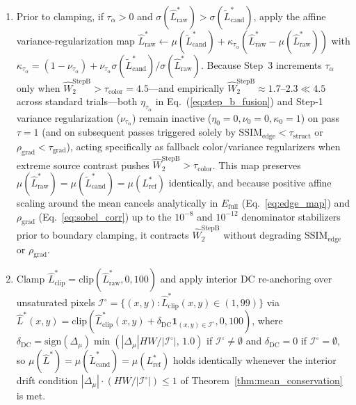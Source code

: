 \documentclass[conference,10pt]{IEEEtran}
\begin{document}
\begin{enumerate}
    \item Prior to clamping, if $\tau_\alpha > 0$ and $\sigma(\widehat{L}^*_{\text{raw}}) > \sigma(\widetilde{L}^*_{\text{cand}})$, apply the affine variance-regularization map $\widehat{L}^*_{\text{raw}} \leftarrow \mu(\widetilde{L}^*_{\text{cand}}) + \kappa_{\tau_\alpha} (\widehat{L}^*_{\text{raw}} - \mu(\widehat{L}^*_{\text{raw}}))$ with $\kappa_{\tau_\alpha} = (1 - \nu_{\tau_\alpha}) + \nu_{\tau_\alpha} \sigma(\widetilde{L}^*_{\text{cand}})/\sigma(\widehat{L}^*_{\text{raw}})$. Because Step~3 increments $\tau_\alpha$ only when $\widehat{W}_2^{\text{StepB}} > \tau_{\text{color}} = 4.5$—and empirically $\widehat{W}_2^{\text{StepB}} \approx 1.7\text{--}2.3 \ll 4.5$ across standard trials—both $\eta_{\tau_\alpha}$ in Eq.~(\ref{eq:step_b_fusion}) and Step-1 variance regularization ($\nu_{\tau_\alpha}$) remain inactive ($\eta_0 = 0, \nu_0 = 0, \kappa_0 = 1$) on pass $\tau = 1$ (and on subsequent passes triggered solely by $\mathrm{SSIM}_{\text{edge}} < \tau_{\text{struct}}$ or $\rho_{\text{grad}} < \tau_{\text{grad}}$), acting specifically as fallback color/variance regularizers when extreme source contrast pushes $\widehat{W}_2^{\text{StepB}} > \tau_{\text{color}}$. This map preserves $\mu(\widehat{L}^*_{\text{raw}}) = \mu(\widetilde{L}^*_{\text{cand}}) = \mu(L^*_{\text{ref}})$ identically, and because positive affine scaling around the mean cancels analytically in $E_{\text{full}}$ (Eq.~\ref{eq:edge_map}) and $\rho_{\text{grad}}$ (Eq.~\ref{eq:sobel_corr}) up to the $10^{-8}$ and $10^{-12}$ denominator stabilizers prior to boundary clamping, it contracts $\widehat{W}_2^{\text{StepB}}$ without degrading $\mathrm{SSIM}_{\text{edge}}$ or $\rho_{\text{grad}}$.
    \item Clamp $\widehat{L}^*_{\text{clip}} = \mathrm{clip}(\widehat{L}^*_{\text{raw}}, 0, 100)$ and apply interior DC re-anchoring over unsaturated pixels $\mathcal{I}^\circ = \{(x,y) : \widehat{L}^*_{\text{clip}}(x,y) \in (1, 99)\}$ via $\widehat{L}^*(x,y) = \mathrm{clip}(\widehat{L}^*_{\text{clip}}(x,y) + \delta_{\text{DC}} \mathbf{1}_{(x,y)\in\mathcal{I}^\circ}, 0, 100)$, where $\delta_{\text{DC}} = \mathrm{sign}(\Delta_\mu)\min(|\Delta_\mu| HW / |\mathcal{I}^\circ|,\, 1.0)$ if $\mathcal{I}^\circ \ne \emptyset$ and $\delta_{\text{DC}} = 0$ if $\mathcal{I}^\circ = \emptyset$, so $\mu(\widehat{L}^*) = \mu(\widetilde{L}^*_{\text{cand}}) = \mu(L^*_{\text{ref}})$ holds identically whenever the interior drift condition $|\Delta_\mu| \cdot (HW/|\mathcal{I}^\circ|) \le 1$ of Theorem~\ref{thm:mean_conservation} is met.

\end{enumerate}
\end{document}
